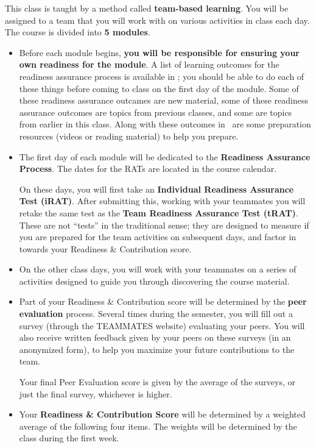 \documentclass{article}
\begin{document}
    This class is taught by a method called {\bf team-based learning}.  You will be assigned to a team that you will work with on various activities in class each day.  The course is divided into {\bf 5 modules}.
    \begin{itemize}
    \item Before each module begins, {\bf you will be responsible for ensuring your own readiness for the module}.  A list of learning outcomes for the readiness assurance process is available in \LMS; you should be able to do each of these things before coming to class on the first day of the module.  Some of these readiness assurance outcames are new material, some of these readiness assurance outcomes are topics from previous classes, and some are topics from earlier in this class.  Along with these outcomes in \LMS\ are some preparation resources (videos or reading material) to help you prepare.
    \item The first day of each module will be dedicated to the {\bf Readiness Assurance Process}.  The dates for the RATs are located in the course calendar.


    On these days, you will first take an {\bf Individual Readiness Assurance Test (iRAT)}.  After submitting this, working with your teammates you will retake the same test as the {\bf Team Readiness Assurance Test (tRAT)}.  These are not ``tests'' in the traditional sense; they are designed to measure if you are prepared for the team activities on subsequent days, and factor in towards your Readiness \& Contribution score.

    \item On the other class days, you will work with your teammates on a series of activities designed to guide you through discovering the course material.

    \item Part of your Readiness \& Contribution score will be determined by the {\bf peer evaluation} process.  Several times during the semester, you will fill out a  survey (through the TEAMMATES website) evaluating your peers.  
    You will also receive written feedback given by your peers on these surveys (in an anonymized form), to help you maximize your future contributions to the team.

    Your final Peer Evaluation score is given by the average of the surveys, or just the final survey, whichever is higher.

    \item Your {\bf Readiness \& Contribution Score} will be determined by a weighted average of the following four items.  The weights will be determined by the class during the first week.


\end{itemize}
\end{document}
